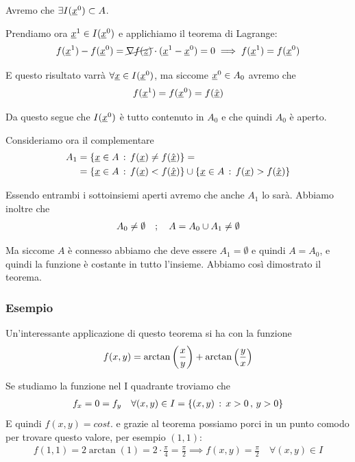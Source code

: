 Avremo che $\exists I(\underline{x}^0)\subset A$.

Prendiamo ora $\underline{x}^1 \in I(\underline{x}^0)$ e applichiamo il teorema di Lagrange:
\begin{align}
	f(\underline{x}^1) - f(\underline{x}^0) = \cancel{\nabla f(\underline{z})} \cdot (\underline{x}^1 - \underline{x}^0)=0\implies f(\underline{x}^1) = f(\underline{x}^0)
\end{align}

E questo risultato varrà $\forall \underline{x} \in I(\underline{x}^0)$, ma siccome $\underline{x}^0 \in A_0$ avremo che 
\begin{align}
	f(\underline{x}^1) = f(\underline{x}^0)=f(\hat{\underline{x}})
\end{align}

Da questo segue che $I(\underline{x}^0)$ è tutto contenuto in $A_0$ e che quindi $A_0$ è aperto.

Consideriamo ora il complementare
\begin{align}
	A_1{}&=\{\underline{x}\in A \, : \, f(\underline{x}) \neq f(\hat{\underline{x}}) \}= \nonumber \\
	&= \{\underline{x}\in A \, : \, f(\underline{x}) < f(\hat{\underline{x}}) \}\cup \{\underline{x}\in A \, : \, f(\underline{x}) > f(\hat{\underline{x}}) \}
\end{align}

Essendo entrambi i sottoinsiemi aperti avremo che anche $A_1$ lo sarà. Abbiamo inoltre che
\begin{align}
	A_0 \neq \emptyset \quad ; \quad A=A_0 \cup A_1 \neq \emptyset 
\end{align}

Ma siccome $A$ è connesso abbiamo che deve essere $A_1 = \emptyset$ e quindi $A=A_0$, e quindi la funzione è costante in tutto l'insieme. Abbiamo così dimostrato il teorema.

\subsubsection{Esempio}

Un'interessante applicazione di questo teorema si ha con la funzione
\begin{align}
	f(x,y)= \arctan \left( \frac{x}{y} \right) + \arctan \left( \frac{y}{x} \right)
\end{align}

Se studiamo la funzione nel I quadrante troviamo che
\begin{align}
	f_x=0=f_y \quad \forall (x,y)\in I=\{(x,y)\, : \, x>0 \, , \, y>0\}
\end{align}
E quindi $f(x,y)=cost.$ e grazie al teorema possiamo porci in un punto comodo per trovare questo valore, per esempio $(1,1)$:
\begin{align}
	f(1,1)=2 \arctan(1)= 2\cdot \frac{\pi}{4}=\frac{\pi}{2} \implies f(x,y)=\frac{\pi}{2} \quad \forall (x,y)\in I
\end{align}

